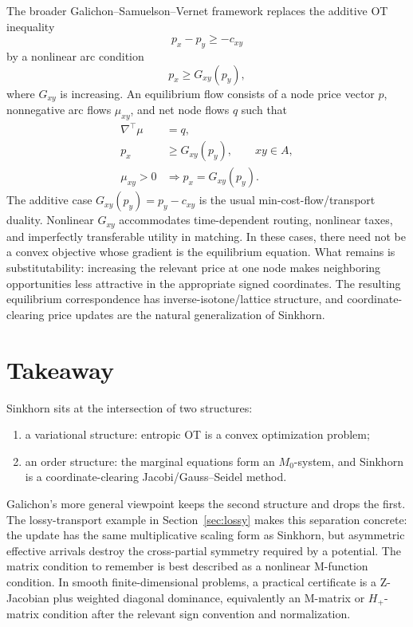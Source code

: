 \documentclass[11pt]{article}
\theoremstyle{definition}
\theoremstyle{plain}
\begin{document}
The broader Galichon--Samuelson--Vernet framework replaces the additive OT inequality
\[
        p_x-p_y\geq -c_{xy}
\]
by a nonlinear arc condition
\[
        p_x\geq G_{xy}(p_y),
\]
where $G_{xy}$ is increasing. An equilibrium flow consists of a node price vector $p$, nonnegative arc flows $\mu_{xy}$, and net node flows $q$ such that
\begin{align*}
        \nabla^\top\mu&=q,\\
        p_x&\geq G_{xy}(p_y),\qquad xy\in A,\\
        \mu_{xy}>0&\Longrightarrow p_x=G_{xy}(p_y).
\end{align*}
The additive case $G_{xy}(p_y)=p_y-c_{xy}$ is the usual min-cost-flow/transport duality. Nonlinear $G_{xy}$ accommodates time-dependent routing, nonlinear taxes, and imperfectly transferable utility in matching. In these cases, there need not be a convex objective whose gradient is the equilibrium equation. What remains is substitutability: increasing the relevant price at one node makes neighboring opportunities less attractive in the appropriate signed coordinates. The resulting equilibrium correspondence has inverse-isotone/lattice structure, and coordinate-clearing price updates are the natural generalization of Sinkhorn.

\section{Takeaway}

Sinkhorn sits at the intersection of two structures:
\begin{enumerate}[label=(\arabic*)]
\item a variational structure: entropic OT is a convex optimization problem;
\item an order structure: the marginal equations form an $M_0$-system, and Sinkhorn is a coordinate-clearing Jacobi/Gauss--Seidel method.
\end{enumerate}
Galichon's more general viewpoint keeps the second structure and drops the first. The lossy-transport example in Section~\ref{sec:lossy} makes this separation concrete: the update has the same multiplicative scaling form as Sinkhorn, but asymmetric effective arrivals destroy the cross-partial symmetry required by a potential. The matrix condition to remember is best described as a nonlinear M-function condition. In smooth finite-dimensional problems, a practical certificate is a Z-Jacobian plus weighted diagonal dominance, equivalently an M-matrix or $H_+$-matrix condition after the relevant sign convention and normalization.
\end{document}
